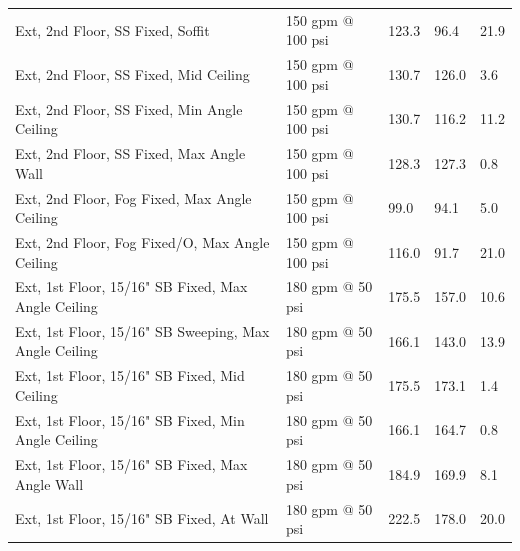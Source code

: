 \documentclass[12pt,oneside]{book}
\begin{document}
\begin{table}[!ht]
\begin{tabular}{lllll}
Ext, 2nd Floor, SS Fixed, Soffit                      & 150 gpm @ 100 psi              & 123.3                             & 96.4                               & 21.9                   \\
Ext, 2nd Floor, SS Fixed, Mid Ceiling                 & 150 gpm @ 100 psi              & 130.7                             & 126.0                              & 3.6                    \\
Ext, 2nd Floor, SS Fixed, Min Angle Ceiling           & 150 gpm @ 100 psi              & 130.7                             & 116.2                              & 11.2                   \\
Ext, 2nd Floor, SS Fixed, Max Angle Wall              & 150 gpm @ 100 psi              & 128.3                             & 127.3                              & 0.8                    \\
Ext, 2nd Floor, Fog Fixed, Max Angle Ceiling          & 150 gpm @ 100 psi              &  99.0                             & 94.1                               & 5.0                    \\
Ext, 2nd Floor, Fog Fixed/O, Max Angle Ceiling        & 150 gpm @ 100 psi              & 116.0                             & 91.7                               & 21.0                   \\
Ext, 1st Floor, 15/16" SB Fixed, Max Angle Ceiling    & 180 gpm @ 50 psi               & 175.5                             & 157.0                              & 10.6                   \\
Ext, 1st Floor, 15/16" SB Sweeping, Max Angle Ceiling & 180 gpm @ 50 psi               & 166.1                             & 143.0                              & 13.9                   \\
Ext, 1st Floor, 15/16" SB Fixed, Mid Ceiling          & 180 gpm @ 50 psi               & 175.5                             & 173.1                              & 1.4                    \\
Ext, 1st Floor, 15/16" SB Fixed, Min Angle Ceiling    & 180 gpm @ 50 psi               & 166.1                             & 164.7                              & 0.8                    \\
Ext, 1st Floor, 15/16" SB Fixed, Max Angle Wall       & 180 gpm @ 50 psi               & 184.9                             & 169.9                              & 8.1                    \\
Ext, 1st Floor, 15/16" SB Fixed, At Wall              & 180 gpm @ 50 psi               & 222.5                             & 178.0                              & 20.0                   \\

\end{tabular}
\end{table}
\end{document}
